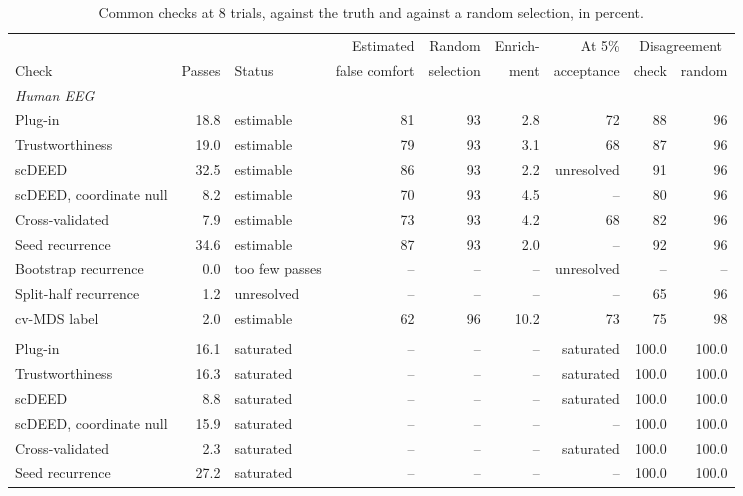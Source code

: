 \documentclass[11pt]{article}
\begin{document}
\begin{table}[!htb]
\centering\footnotesize
\caption{Common checks at 8 trials, against the truth and against a random selection, in percent.}
\label{tab:benchmark}
\setlength{\tabcolsep}{4pt}
\begin{tabular}{lr>{\raggedright\arraybackslash}p{1.6cm}rrrrrr}
\toprule
 & & & Estimated & Random & Enrich- & At 5\% & \multicolumn{2}{c}{Disagreement} \\
\cmidrule(lr){8-9}
Check & Passes & Status & false comfort & selection & ment & acceptance & check & random \\
\midrule
\multicolumn{9}{l}{\textit{Human EEG}} \\
\quad Plug-in & 18.8 & estimable & 81 & 93 & 2.8 & 72 & 88 & 96 \\
\quad Trustworthiness & 19.0 & estimable & 79 & 93 & 3.1 & 68 & 87 & 96 \\
\quad scDEED & 32.5 & estimable & 86 & 93 & 2.2 & unresolved & 91 & 96 \\
\quad scDEED, coordinate null & 8.2 & estimable & 70 & 93 & 4.5 & -- & 80 & 96 \\
\quad Cross-validated & 7.9 & estimable & 73 & 93 & 4.2 & 68 & 82 & 96 \\
\quad Seed recurrence & 34.6 & estimable & 87 & 93 & 2.0 & -- & 92 & 96 \\
\quad Bootstrap recurrence & 0.0 & too few passes & -- & -- & -- & unresolved & -- & -- \\
\quad Split-half recurrence & 1.2 & unresolved & -- & -- & -- & -- & 65 & 96 \\
\quad cv-MDS label & 2.0 & estimable & 62 & 96 & 10.2 & 73 & 75 & 98 \\
\addlinespace
\multicolumn{9}{l}{\textit{Mouse V1}} \\
\quad Plug-in & 16.1 & saturated & -- & -- & -- & saturated & 100.0 & 100.0 \\
\quad Trustworthiness & 16.3 & saturated & -- & -- & -- & saturated & 100.0 & 100.0 \\
\quad scDEED & 8.8 & saturated & -- & -- & -- & saturated & 100.0 & 100.0 \\
\quad scDEED, coordinate null & 15.9 & saturated & -- & -- & -- & -- & 100.0 & 100.0 \\
\quad Cross-validated & 2.3 & saturated & -- & -- & -- & saturated & 100.0 & 100.0 \\
\quad Seed recurrence & 27.2 & saturated & -- & -- & -- & -- & 100.0 & 100.0 \\

\end{tabular}
\end{table}
\end{document}
